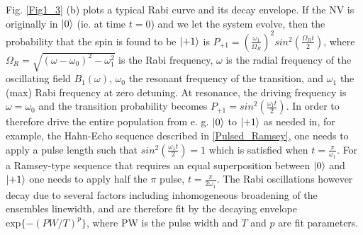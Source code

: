 Fig. \ref{Fig1_3} (b) plots a typical Rabi curve and its decay envelope. If the NV is originally in $\ket{0}$ (ie. at time $t = 0$) and we let the system evolve, then the probability that the spin is found to be $\ket{+1}$ is $P_{+1} = \left(\frac{\omega_1}{\Omega_R}\right)^2 sin^2\left(\frac{\Omega_R t}{2}\right)$, where $\Omega_R = \sqrt{(\omega-\omega_0)^2-\omega_1^2}$ is the Rabi frequency, $\omega$ is the radial frequency of the oscillating field $B_1(\omega)$, $\omega_0$ the resonant frequency of the transition, and $\omega_1$ the (max) Rabi frequency at zero detuning. At resonance, the driving frequency is $\omega = \omega_0$ and the transition probability becomes $P_{+1} = sin^2\left(\frac{\omega_1 t}{2}\right)$. In order to therefore drive the entire population from e. g. $\ket{0}$ to $\ket{+1}$ as needed in, for example, the Hahn-Echo sequence described in \ref{Pulsed_Ramsey}, one needs to apply a pulse length such that $sin^2 \left(\frac{\omega_1 t}{2}\right) = 1$ which is satisfied when $t = \frac{\pi}{\omega_1}$. For a Ramsey-type sequence that requires an equal superposition between $\ket{0}$ and $\ket{+1}$ one needs to apply half the $\pi$ pulse, $t = \frac{\pi}{2\omega_1}$. The Rabi oscillations however decay due to several factors including inhomogeneous broadening of the ensembles linewidth, and are therefore fit by the decaying envelope $\text{exp}\{-\left(PW/T\right)^p\}$, where PW is the pulse width and $T$ and $p$ are fit parameters.


